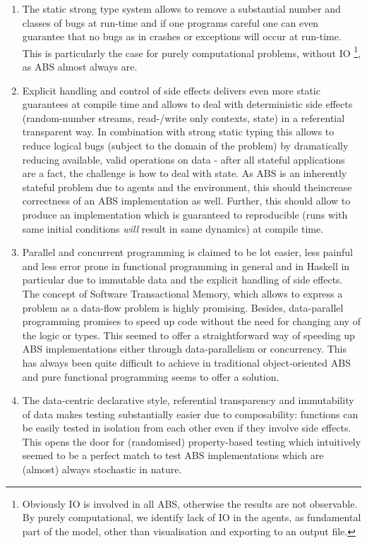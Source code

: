 \begin{enumerate}
	\item The static strong type system allows to remove a substantial number and classes of bugs at run-time and if one programs careful one can even guarantee that no bugs as in crashes or exceptions will occur at run-time. This is particularly the case for purely computational problems, without IO \footnote{Obviously IO is involved in all ABS, otherwise the results are not observable. By purely computational, we identify lack of IO in the agents, as fundamental part of the model, other than visualisation and exporting to an output file.}, as ABS almost always are. 
	
	\item Explicit handling and control of side effects delivers even more static guarantees at compile time and allows to deal with deterministic side effects (random-number streams, read-/write only contexts, state) in a referential transparent way. In combination with strong static typing this allows to reduce logical bugs (subject to the domain of the problem) by dramatically reducing available, valid operations on data - after all stateful applications are a fact, the challenge is how to deal with state. As ABS is an inherently stateful problem due to agents and the environment, this should  theincrease correctness of an ABS implementation as well. Further, this should allow to produce an implementation which is guaranteed to reproducible (runs with same initial conditions \textit{will} result in same dynamics) at compile time.
	
	\item Parallel and concurrent programming is claimed to be lot easier, less painful and less error prone in functional programming in general and in Haskell in particular due to immutable data and the explicit handling of side effects. The concept of Software Transactional Memory, which allows to express a problem as a data-flow problem is highly promising. Besides, data-parallel programming promises to speed up code without the need for changing any of the logic or types. This seemed to offer a straightforward way of speeding up ABS implementations either through data-parallelism or concurrency. This has always been quite difficult to achieve in traditional object-oriented ABS and pure functional programming seems to offer a solution.
	
	\item The data-centric declarative style, referential transparency and immutability of data makes testing substantially easier due to composability: functions can be easily tested in isolation from each other even if they involve side effects. This opens the door for (randomised) property-based testing which intuitively seemed to be a perfect match to test ABS implementations which are (almost) always stochastic in nature.
\end{enumerate}

